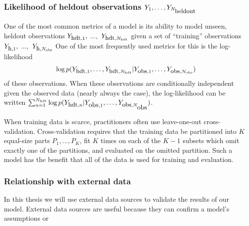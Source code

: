 

\subsubsection{Likelihood of heldout observations $Y_1, \ldots,
  Y_{N_{\mbox{\small heldout}}}$}
One of the most common metrics of a model is its ability to model
unseen, heldout observations $Y_{\mbox{\small hdt},1},$ $\ldots,$
$Y_{\mbox{\small hdt},N_{\mbox{\tiny hdt}}}$ given a set of ``training''
  observations $Y_{\mbox{\small h},1},$ $\ldots,$ $Y_{\mbox{\small
      h},N_{\mbox{\tiny obs}}}$ One of the most frequently used metrics
    for this is the log-likelihood
\begin{align*}
  \log
  p(Y_{\mbox{\small hdt},1}, \ldots, Y_{\mbox{\small hdt},N_{\mbox{\tiny hdt}}}
  | Y_{\mbox{\small obs},1}, \ldots, Y_{\mbox{\small obs}, N_{\mbox{\tiny obs}}})
\end{align*}
of these observations. When these observations are conditionally
independent given the observed data (nearly always the case), the
log-likelihood can be written $\sum_{n=1}^{N_{\mbox{\tiny hdt}}} \log
  p(Y_{\mbox{\small hdt},n} | Y_{\mbox{obs},1}, \ldots, Y_{\mbox{\small obs},N_{\mbox{obs}}})$.

When training data is scarce, practitioners often use leave-one-out
cross-validation.  Cross-validation requires that the training data be
partitioned into $K$ equal-size parts $P_1, \ldots, P_K$, fit $K$
times on each of the $K - 1$ subsets which omit exactly one of the
partitions, and evaluated on the omitted partition.  Such a model has
the benefit that all of the data is used for training and evaluation.

\subsubsection{Relationship with external data}
In this thesis we will use external data sources to validate the
results of our model.  External data sources are useful because they
can confirm a model's assumptions or 

